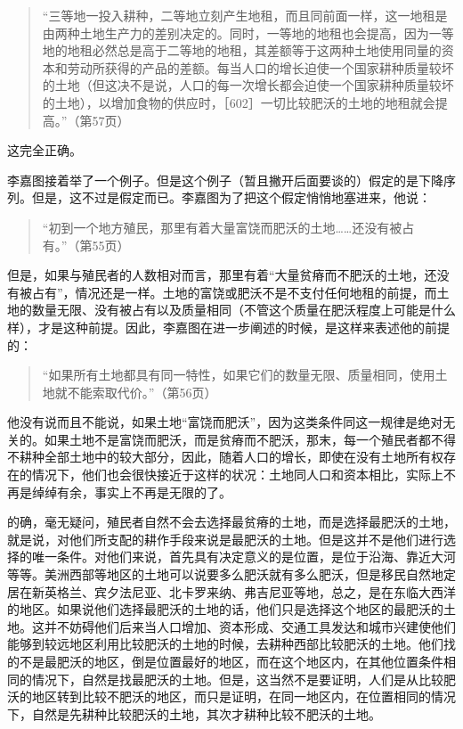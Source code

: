 \begin{quote}{“三等地一投入耕种，二等地立刻产生地租，而且同前面一样，这一地租是由两种土地生产力的差别决定的。同时，一等地的地租也会提高，因为一等地的地租必然总是高于二等地的地租，其差额等于这两种土地使用同量的资本和劳动所获得的产品的差额。每当人口的增长迫使一个国家耕种质量较坏的土地（但这决不是说，人口的每一次增长都会迫使一个国家耕种质量较坏的土地），以增加食物的供应时，［602］一切比较肥沃的土地的地租就会提高。”（第57页）}\end{quote}

这完全正确。

李嘉图接着举了一个例子。但是这个例子（暂且撇开后面要谈的）假定的是下降序列。但是，这不过是假定而已。李嘉图为了把这个假定悄悄地塞进来，他说：

\begin{quote}{“初到一个地方殖民，那里有着大量富饶而肥沃的土地……还没有被占有。”（第55页）}\end{quote}

但是，如果与殖民者的人数相对而言，那里有着“大量贫瘠而不肥沃的土地，还没有被占有”，情况还是一样。土地的富饶或肥沃不是不支付任何地租的前提，而土地的数量无限、没有被占有以及质量相同（不管这个质量在肥沃程度上可能是什么样），才是这种前提。因此，李嘉图在进一步阐述的时候，是这样来表述他的前提的：

\begin{quote}{“如果所有土地都具有同一特性，如果它们的数量无限、质量相同，使用土地就不能索取代价。”（第56页）}\end{quote}

他没有说而且不能说，如果土地“富饶而肥沃”，因为这类条件同这一规律是绝对无关的。如果土地不是富饶而肥沃，而是贫瘠而不肥沃，那末，每一个殖民者都不得不耕种全部土地中的较大部分，因此，随着人口的增长，即使在没有土地所有权存在的情况下，他们也会很快接近于这样的状况：土地同人口和资本相比，实际上不再是绰绰有余，事实上不再是无限的了。

的确，毫无疑问，殖民者自然不会去选择最贫瘠的土地，而是选择最肥沃的土地，就是说，对他们所支配的耕作手段来说是最肥沃的土地。但是这并不是他们进行选择的唯一条件。对他们来说，首先具有决定意义的是位置，是位于沿海、靠近大河等等。美洲西部等地区的土地可以说要多么肥沃就有多么肥沃，但是移民自然地定居在新英格兰、宾夕法尼亚、北卡罗来纳、弗吉尼亚等地，总之，是在东临大西洋的地区。如果说他们选择最肥沃的土地的话，他们只是选择这个地区的最肥沃的土地。这并不妨碍他们后来当人口增加、资本形成、交通工具发达和城市兴建使他们能够到较远地区利用比较肥沃的土地的时候，去耕种西部比较肥沃的土地。他们找的不是最肥沃的地区，倒是位置最好的地区，而在这个地区内，在其他位置条件相同的情况下，自然是找最肥沃的土地。但是，这当然不是要证明，人们是从比较肥沃的地区转到比较不肥沃的地区，而只是证明，在同一地区内，在位置相同的情况下，自然是先耕种比较肥沃的土地，其次才耕种比较不肥沃的土地。


